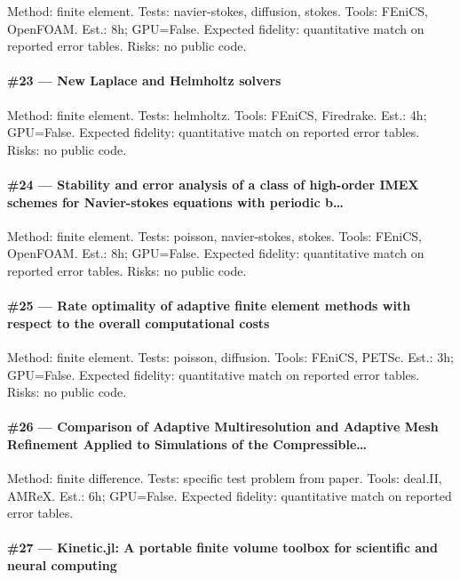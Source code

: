 \documentclass[10pt,letterpaper]{article}
\begin{document}
Method: finite element. Tests: navier-stokes, diffusion, stokes. Tools: FEniCS, OpenFOAM. Est.: 8h; GPU=False. Expected fidelity: quantitative match on reported error tables. Risks: no public code.

\paragraph{\#23 — New Laplace and Helmholtz solvers}

Method: finite element. Tests: helmholtz. Tools: FEniCS, Firedrake. Est.: 4h; GPU=False. Expected fidelity: quantitative match on reported error tables. Risks: no public code.

\paragraph{\#24 — Stability and error analysis of a class of high-order IMEX schemes for Navier-stokes equations with periodic b…}

Method: finite element. Tests: poisson, navier-stokes, stokes. Tools: FEniCS, OpenFOAM. Est.: 8h; GPU=False. Expected fidelity: quantitative match on reported error tables. Risks: no public code.

\paragraph{\#25 — Rate optimality of adaptive finite element methods with respect to the overall computational costs}

Method: finite element. Tests: poisson, diffusion. Tools: FEniCS, PETSc. Est.: 3h; GPU=False. Expected fidelity: quantitative match on reported error tables. Risks: no public code.

\paragraph{\#26 — Comparison of Adaptive Multiresolution and Adaptive Mesh Refinement Applied to Simulations of the Compressible…}

Method: finite difference. Tests: specific test problem from paper. Tools: deal.II, AMReX. Est.: 6h; GPU=False. Expected fidelity: quantitative match on reported error tables. 

\paragraph{\#27 — Kinetic.jl: A portable finite volume toolbox for scientific and neural computing}
\end{document}
